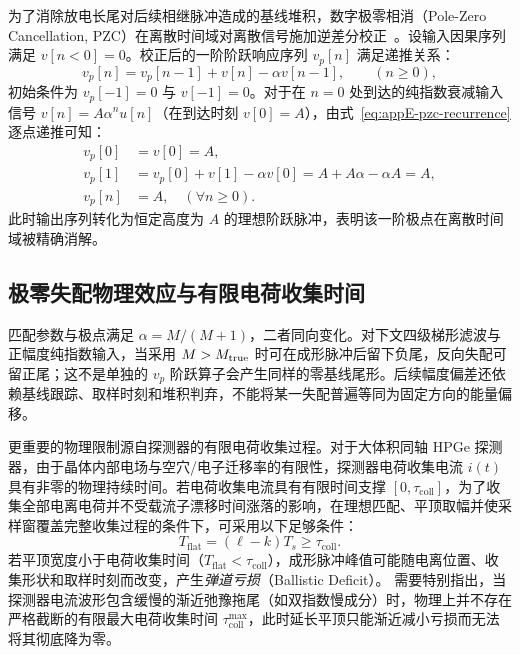 为了消除放电长尾对后续相继脉冲造成的基线堆积，数字极零相消（Pole-Zero Cancellation, PZC）在离散时间域对离散信号施加逆差分校正~\cite{wu-hongyi-2020-general-purpose-digital-daq-thesis, wu-2021-general-purpose-digital-daq-waveform-analysis}。设输入因果序列满足 $v[n < 0] = 0$。校正后的一阶阶跃响应序列 $v_p[n]$ 满足递推关系：
\begin{equation}\label{eq:appE-pzc-recurrence}
v_p[n] = v_p[n-1] + v[n] - \alpha v[n-1], \qquad (n \ge 0),
\end{equation}
初始条件为 $v_p[-1] = 0$ 与 $v[-1] = 0$。对于在 $n=0$ 处到达的纯指数衰减输入信号 $v[n] = A \alpha^n u[n]$（在到达时刻 $v[0] = A$），由式~\eqref{eq:appE-pzc-recurrence}逐点递推可知：
\begin{align}
v_p[0] &= v[0] = A, \nonumber \\
v_p[1] &= v_p[0] + v[1] - \alpha v[0] = A + A\alpha - \alpha A = A, \nonumber \\
v_p[n] &= A, \quad (\forall n \ge 0).
\end{align}
此时输出序列转化为恒定高度为 $A$ 的理想阶跃脉冲，表明该一阶极点在离散时间域被精确消解。

\subsection{极零失配物理效应与有限电荷收集时间}

匹配参数与极点满足 $\alpha=M/(M+1)$，二者同向变化。对下文四级梯形滤波与正幅度纯指数输入，当采用 $M>M_{\rm true}$ 时可在成形脉冲后留下负尾，反向失配可留正尾；这不是单独的 $v_p$ 阶跃算子会产生同样的零基线尾形。后续幅度偏差还依赖基线跟踪、取样时刻和堆积判弃，不能将某一失配普遍等同为固定方向的能量偏移。

更重要的物理限制源自探测器的有限电荷收集过程。对于大体积同轴 HPGe 探测器，由于晶体内部电场与空穴/电子迁移率的有限性，探测器电荷收集电流 $i(t)$ 具有非零的物理持续时间。若电荷收集电流具有有限时间支撑 $[0, \tau_{\mathrm{coll}}]$，为了收集全部电离电荷并不受载流子漂移时间涨落的影响，在理想匹配、平顶取幅并使采样窗覆盖完整收集过程的条件下，可采用以下足够条件：
\begin{equation}\label{eq:appE-flat-top-ballistic-cond}
T_{\mathrm{flat}} = (\ell - k) T_s \ge \tau_{\mathrm{coll}}.
\end{equation}
若平顶宽度小于电荷收集时间（$T_{\mathrm{flat}} < \tau_{\mathrm{coll}}$），成形脉冲峰值可能随电离位置、收集形状和取样时刻而改变，产生\emph{弹道亏损}（Ballistic Deficit）。
需要特别指出，当探测器电流波形包含缓慢的渐近弛豫拖尾（如双指数慢成分）时，物理上并不存在严格截断的有限最大电荷收集时间 $\tau_{\mathrm{coll}}^{\max}$，此时延长平顶只能渐近减小亏损而无法将其彻底降为零。

